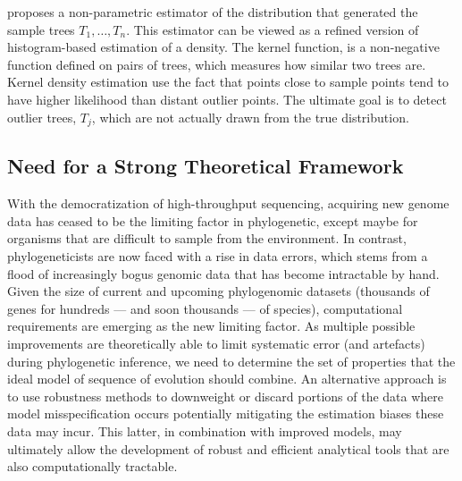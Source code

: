 \cite{weyenberg2014kdetrees}  proposes  a non-parametric estimator of the distribution that generated the sample trees $T_1,\ldots,T_n$.  This estimator can be viewed as a refined version of histogram-based estimation of a density. The kernel function, is a non-negative function defined on pairs of trees, which measures how similar two trees are. Kernel density estimation use the fact that points close to sample points tend to have higher likelihood than distant outlier points.  The ultimate goal is to detect outlier trees, $T_j$, which are not actually drawn from the true distribution.
%

\subsection{Need for a Strong Theoretical Framework} 

With the democratization of high-throughput sequencing, acquiring new genome data has ceased to be the limiting factor in phylogenetic, except maybe for organisms that are difficult to sample from the environment. In contrast, phylogeneticists are now faced with a rise in data errors, which stems from a flood of increasingly bogus genomic data that has become intractable by hand. Given the size of current and upcoming phylogenomic datasets (thousands of genes for hundreds —   and soon thousands —   of species), computational requirements are emerging as the new limiting factor. As multiple possible improvements are theoretically able to limit systematic error (and artefacts) during phylogenetic inference, we  need  to determine the set of properties that the ideal model of sequence of evolution should combine.  An alternative approach is to use robustness methods to downweight or discard portions of the data where model misspecification occurs potentially mitigating the estimation biases these data may incur. This latter, in combination with improved models, may ultimately allow the development of robust and efficient analytical
tools that are also computationally tractable. 